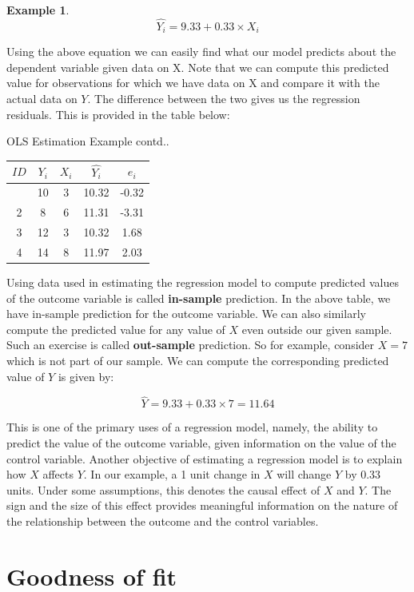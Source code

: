 \documentclass[
]{book}
\theoremstyle{definition}
\theoremstyle{definition}
\newtheorem{example}{Example}[chapter]
\theoremstyle{definition}
\theoremstyle{definition}
\theoremstyle{remark}
\begin{document}
\begin{example}
\[\hat{Y_i} = 9.33 + 0.33 \times X_i \]

Using the above equation we can easily find what our model predicts about the dependent variable given data on X. Note that we can compute this predicted value for observations for which we have data on X and compare it with the actual data on \(Y\). The difference between the two gives us the regression residuals. This is provided in the table below:

\label{tab:ch3table3} OLS Estimation Example contd..

\begin{longtable}[]{@{}ccccc@{}}
\toprule\noalign{}
\(ID\) & \(Y_i\) & \(X_i\) & \(\hat{Y_i}\) & \(e_i\) \\
\midrule\noalign{}
\endhead
\bottomrule\noalign{}
\endlastfoot
1 & 10 & 3 & 10.32 & -0.32 \\
2 & 8 & 6 & 11.31 & -3.31 \\
3 & 12 & 3 & 10.32 & 1.68 \\
4 & 14 & 8 & 11.97 & 2.03 \\
\end{longtable}

Using data used in estimating the regression model to compute predicted values of the outcome variable is called \textbf{in-sample} prediction. In the above table, we have in-sample prediction for the outcome variable. We can also similarly compute the predicted value for any value of \(X\) even outside our given sample. Such an exercise is called \textbf{out-sample} prediction. So for example, consider \(X=7\) which is not part of our sample. We can compute the corresponding predicted value of \(Y\) is given by:

\[\hat{Y} = 9.33+0.33\times 7= 11.64 \]

This is one of the primary uses of a regression model, namely, the ability to predict the value of the outcome variable, given information on the value of the control variable. Another objective of estimating a regression model is to explain how \(X\) affects \(Y\). In our example, a 1 unit change in \(X\) will change \(Y\) by 0.33 units. Under some assumptions, this denotes the causal effect of \(X\) and \(Y\). The sign and the size of this effect provides meaningful information on the nature of the relationship between the outcome and the control variables.
\end{example}

\hypertarget{goodness-of-fit}{%
\section{Goodness of fit}\label{goodness-of-fit}}
\end{document}
